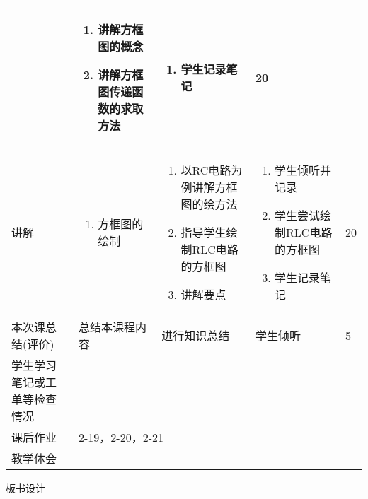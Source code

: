 {\begin{landscape}
\begin{longtable}{|m{10mm}|m{50mm}|m{50mm}|m{50mm}|m{15mm}|}
\begin{enumerate}
\end{enumerate}
 &\begin{enumerate}
\item 讲解方框图的概念
\item 讲解方框图传递函数的求取方法
\end{enumerate} &\begin{enumerate}
\item 学生记录笔记
\end{enumerate} &20 \\\hline
讲解&
\begin{enumerate}
\item 方框图的绘制
\end{enumerate}
 &\begin{enumerate}
\item 以RC电路为例讲解方框图的绘方法
\item 指导学生绘制RLC电路的方框图
\item 讲解要点
\end{enumerate} &\begin{enumerate}
\item 学生倾听并记录
\item 学生尝试绘制RLC电路的方框图
\item 学生记录笔记
\end{enumerate} &20 \\\hline
\centering 本次课总结(评价)&总结本课程内容 &进行知识总结 &学生倾听 &5 \\\hline
\centering 学生学习笔记或工单等检查情况&\multicolumn{4}{m{165mm}|}{\quad}\\\hline
\centering 课后作业&\multicolumn{4}{m{165mm}|}{2-19，2-20，2-21}\\\hline
\centering 教学体会&\multicolumn{4}{m{165mm}|}{\quad}\\
\end{longtable}

\end{landscape}
\clearpage
\begin{center}
{\huge 板书设计}
\end{center}
}
